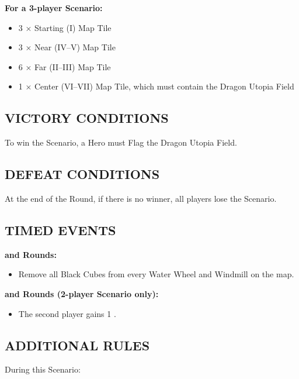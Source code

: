 \begin{multicols*}{2}
\textbf{For a 3-player Scenario:}
\begin{itemize}
  \item 3 × Starting (I) Map Tile
  \item 3 × Near (IV--V) Map Tile
  \item 6 × Far (II--III) Map Tile
  \item 1 × Center (VI--VII) Map Tile, which must contain the Dragon Utopia Field
\end{itemize}

\subsection*{\MakeUppercase{Victory Conditions}}
To win the Scenario, a Hero must Flag the Dragon Utopia Field.

\subsection*{\MakeUppercase{Defeat Conditions}}
At the end of the  Round, if there is no winner, all players lose the Scenario.

\subsection*{\MakeUppercase{Timed Events}}

\textbf{ and  Rounds:}
\begin{itemize}
  \item Remove all Black Cubes from every Water Wheel and Windmill on the map.
\end{itemize}

\textbf{ and  Rounds (2-player Scenario only):}
\begin{itemize}
  \item The second player gains 1 .
\end{itemize}

\subsection*{\MakeUppercase{Additional Rules}}

During this Scenario:


\end{multicols*}
